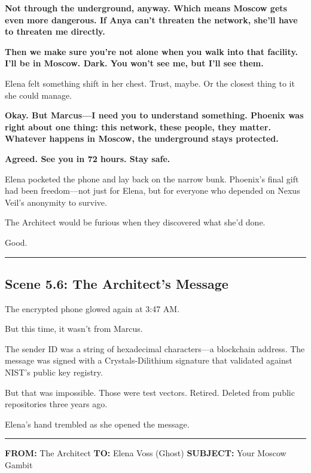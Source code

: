 \documentclass[12pt,letterpaper]{book}
\begin{document}
\textbf{Not through the underground, anyway. Which means Moscow gets even more dangerous. If Anya can't threaten the network, she'll have to threaten me directly.}

\textbf{Then we make sure you're not alone when you walk into that facility. I'll be in Moscow. Dark. You won't see me, but I'll see them.}

Elena felt something shift in her chest. Trust, maybe. Or the closest thing to it she could manage.

\textbf{Okay. But Marcus---I need you to understand something. Phoenix was right about one thing: this network, these people, they matter. Whatever happens in Moscow, the underground stays protected.}

\textbf{Agreed. See you in 72 hours. Stay safe.}

Elena pocketed the phone and lay back on the narrow bunk. Phoenix's final gift had been freedom---not just for Elena, but for everyone who depended on Nexus Veil's anonymity to survive.

The Architect would be furious when they discovered what she'd done.

Good.

\begin{center}\rule{0.5\linewidth}{0.5pt}\end{center}

\hypertarget{scene-5.6-the-architects-message}{%
\subsection{Scene 5.6: The Architect's Message}\label{scene-5.6-the-architects-message}}

The encrypted phone glowed again at 3:47 AM.

But this time, it wasn't from Marcus.

The sender ID was a string of hexadecimal characters---a blockchain address. The message was signed with a Crystals-Dilithium signature that validated against NIST's public key registry.

But that was impossible. Those were test vectors. Retired. Deleted from public repositories three years ago.

Elena's hand trembled as she opened the message.

\begin{center}\rule{0.5\linewidth}{0.5pt}\end{center}

\textbf{FROM:} The Architect \textbf{TO:} Elena Voss (Ghost) \textbf{SUBJECT:} Your Moscow Gambit
\end{document}
